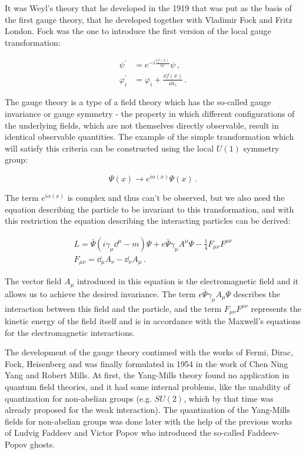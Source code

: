 It was Weyl's theory that he developed in the 1919 that was put as the basis of the first gauge theory, that he developed together with Vladimir Fock and Fritz London. Fock was the one to introduce the first version of the local gauge transformation:

\begin{equation}
\begin{split}
\psi^{'} &= e^{-i\frac{ef(x)}{hc}}\psi \,,\\
\varphi^{'}_{i} &= \varphi_{i} + \frac{\dd f(x)}{\dd x_{i}} \,.
\end{split}
\end{equation}

The gauge theory is a type of a field theory which has the so-called gauge invariance or gauge symmetry - the property in which different configurations of the underlying fields, which are not themselves directly observable, result in identical observable quantities. The example of the simple transformation which will satisfy this criteria can be constructed using the local $U(1)$ symmetry group:

\begin{equation}
\Psi(x) \to e^{i\alpha(x)}\Psi(x)\,.
\end{equation}

The term $e^{i\alpha(x)}$ is complex and thus can't be observed, but we also need the equation describing the particle to be invariant to this transformation, and with this restriction the equation describing the interacting particles can be derived:

\begin{equation}
\begin{gathered}
L = \bar \Psi (i \gamma_{\mu} \dd^{\mu} - m) \Psi + e \bar \Psi \gamma_{\mu} A^{\mu} \Psi - \frac{1}{4} F_{\mu\nu}F^{\mu\nu}\\
F_{\mu\nu} = \dd_{\mu}A_{\nu} - \dd_{\nu}A_{\mu}\,.
\end{gathered}
\end{equation}

The vector field $A_{\mu}$ introduced in this equation is the electromagnetic field and it allows us to achieve the desired invariance. The term $e \bar \Psi \gamma_{\mu} A_{\mu} \Psi$ describes the interaction between this field and the particle, and the term $F_{\mu\nu}F^{\mu\nu}$ represents the kinetic energy of the field itself and is in accordance with the Maxwell's equations for the electromagnetic interactions.

The development of the gauge theory continued with the works of Fermi, Dirac, Fock, Heisenberg and was finally formulated in 1954 in the work of Chen Ning Yang and Robert Mills. At first, the Yang-Mills theory found no application in quantum field theories, and it had some internal problems, like the unability of quantization for non-abelian groups (e.g. $SU(2)$, which by that time was already proposed for the weak interaction). The quantization of the Yang-Mills fields for non-abelian groups was done later with the help of the previous works of Ludvig Faddeev and Victor Popov who introduced the so-called Faddeev-Popov ghosts.

